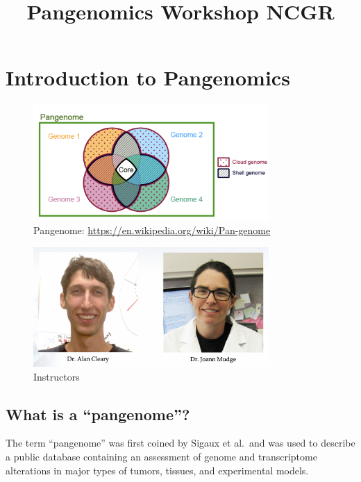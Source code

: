 \documentclass[
]{book}
\title{Pangenomics Workshop NCGR}
\author{}
\date{\vspace{-2.5em}}
\begin{document}
\maketitle

{
\setcounter{tocdepth}{1}
\tableofcontents
}
\hypertarget{introduction-to-pangenomics}{%
\chapter{Introduction to Pangenomics}\label{introduction-to-pangenomics}}

\begin{figure}
\centering
\includegraphics[width=0.8\textwidth,height=\textheight]{./Figures/Pangenome.png}
\caption{Pangenome: \url{https://en.wikipedia.org/wiki/Pan-genome}}
\end{figure}

\begin{figure}
\centering
\includegraphics[width=0.8\textwidth,height=\textheight]{./Figures/JoannAlan.png}
\caption{Instructors}
\end{figure}

\hypertarget{what-is-a-pangenome}{%
\section{What is a ``pangenome''?}\label{what-is-a-pangenome}}

The term ``pangenome'' was first coined by Sigaux et al.~and was used to describe a public database containing an assessment of genome and transcriptome alterations in major types of tumors, tissues, and experimental models.
\end{document}
